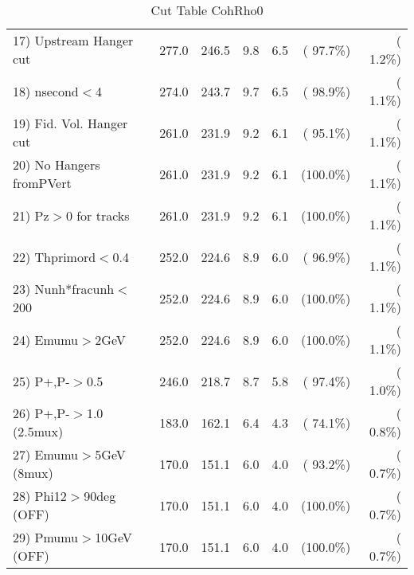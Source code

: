 \begin{table}[h!]
\begin{tabular}{||l||r|r|r|r|r|r||}
 17) Upstream Hanger cut  &        277.0 &        246.5 &          9.8 &          6.5 & ( 97.7\%) & (  1.2\%) \\
 18) nsecond$<$4          &        274.0 &        243.7 &          9.7 &          6.5 & ( 98.9\%) & (  1.1\%) \\
 19) Fid. Vol. Hanger cut &        261.0 &        231.9 &          9.2 &          6.1 & ( 95.1\%) & (  1.1\%) \\
 20) No Hangers fromPVert &        261.0 &        231.9 &          9.2 &          6.1 & (100.0\%) & (  1.1\%) \\
 21) Pz$>$0 for tracks    &        261.0 &        231.9 &          9.2 &          6.1 & (100.0\%) & (  1.1\%) \\
 22) Thprimord$<$0.4      &        252.0 &        224.6 &          8.9 &          6.0 & ( 96.9\%) & (  1.1\%) \\
 23) Nunh*fracunh$<$200   &        252.0 &        224.6 &          8.9 &          6.0 & (100.0\%) & (  1.1\%) \\
 24) Emumu$>$2GeV         &        252.0 &        224.6 &          8.9 &          6.0 & (100.0\%) & (  1.1\%) \\
 25) P+,P-$>$0.5          &        246.0 &        218.7 &          8.7 &          5.8 & ( 97.4\%) & (  1.0\%) \\
 26) P+,P-$>$1.0 (2.5mux) &        183.0 &        162.1 &          6.4 &          4.3 & ( 74.1\%) & (  0.8\%) \\
 27) Emumu$>$5GeV  (8mux) &        170.0 &        151.1 &          6.0 &          4.0 & ( 93.2\%) & (  0.7\%) \\
 28) Phi12$>$90deg  (OFF) &        170.0 &        151.1 &          6.0 &          4.0 & (100.0\%) & (  0.7\%) \\
 29) Pmumu$>$10GeV  (OFF) &        170.0 &        151.1 &          6.0 &          4.0 & (100.0\%) & (  0.7\%) \\
 \hline
 \hline
 \end{tabular}
 \caption{Cut Table  CohRho0  }
 \label{tab-cutcohjpsi-mumu_cohrho0}
 \end{table}
